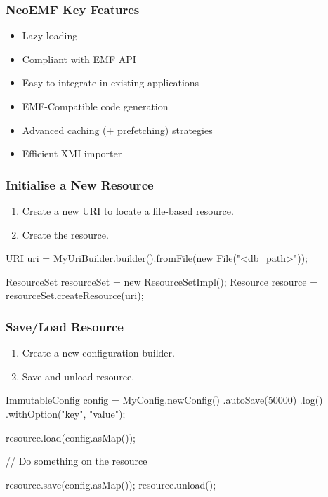 \documentclass[10pt]{beamer}
\begin{document}
\begin{frame}[c]\frametitle{NeoEMF Key Features}
	\begin{itemize}
		\item Lazy-loading
		\item Compliant with EMF API
		\item Easy to integrate in existing applications
		\item EMF-Compatible code generation
		\item Advanced caching (+ prefetching) strategies
		\item Efficient XMI importer
	\end{itemize}
\end{frame}

\begin{frame}[fragile]\frametitle{Initialise a New Resource}
	\begin{enumerate}
		\item Create a new URI to locate a file-based resource.
		\item Create the resource.
	\end{enumerate}
	
\begin{java}
URI uri = MyUriBuilder.builder().fromFile(new File("<db_path>"));

ResourceSet resourceSet = new ResourceSetImpl();
Resource resource = resourceSet.createResource(uri);
\end{java}
\end{frame}

\begin{frame}[fragile]\frametitle{Save/Load Resource}
	
	\begin{enumerate}
		\item Create a new configuration builder.
		\item Save and unload resource.
	\end{enumerate}
\begin{java}
ImmutableConfig config = MyConfig.newConfig()
  .autoSave(50000)              
  .log()                        
  .withOption("key", "value");  

resource.load(config.asMap()); 

// Do something on the resource

resource.save(config.asMap()); 
resource.unload();
\end{java}
	
\end{frame}
\end{document}
